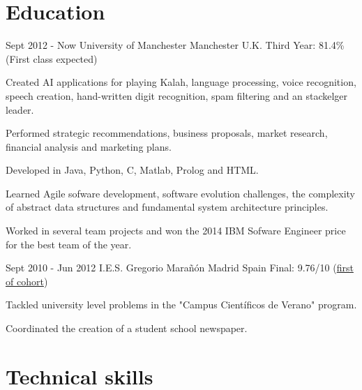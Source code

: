 \documentclass[10pt]{CurriculumVitae}
\begin{document}
  \section{Education}
   
      {Sept 2012 - Now}
      {University of Manchester}
      {Manchester}
      {U.K.}
      {Third Year: 81.4\% (First class expected)}
      {
         \item Created AI applications for playing Kalah, language processing, voice recognition, speech creation, 
         hand-written digit recognition, spam filtering and an stackelger leader.
         \item Performed strategic recommendations, business proposals, market research, financial analysis and marketing plans.
         \item Developed in Java, Python, C, Matlab, Prolog and HTML.
         \item Learned Agile sofware development, software evolution challenges, the complexity of abstract data structures and
          fundamental system architecture principles. 
         \item Worked in several team projects and won the 2014 IBM Sofware Engineer price for the best team of the year.
      }

      {Sept 2010 - Jun 2012}
      {I.E.S. Gregorio Marañón}
      {Madrid}
      {Spain}
      {Final: 9.76/10 (\underline{first of cohort})}
      {
         \item Tackled university level problems in the "Campus Científicos de Verano" program.
         \item Coordinated the creation of a student school newspaper.
      }


  \section{Technical skills}
    
\end{document}

